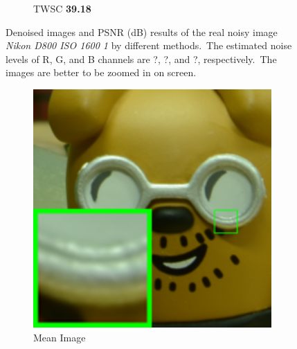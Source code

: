 \begin{figure}
\begin{subfigure}[t]{0.19\textwidth}
		\caption{TWSC \textbf{39.18}}
    \end{subfigure}
    \caption{Denoised images and PSNR (dB) results of the real noisy image \textsl{Nikon D800 ISO 1600 1} \cite{crosschannel2016} by different methods.\ The estimated noise levels of R, G, and B channels are ?, ?, and ?, respectively.\ The images are better to be zoomed in on screen.}
    \label{fig5-13}
\end{figure}


\begin{figure}
    \centering
    \begin{subfigure}[t]{0.19\textwidth}
        \centering
        \includegraphics[width=1\textwidth]{images/twsc/cc/resize_br_Mean_d800_iso3200_1_real.png}
		\caption{Mean Image}
    \end{subfigure}
    \hfill
    \begin{subfigure}[t]{0.19\textwidth}
        \centering

\end{subfigure}
\end{figure}
